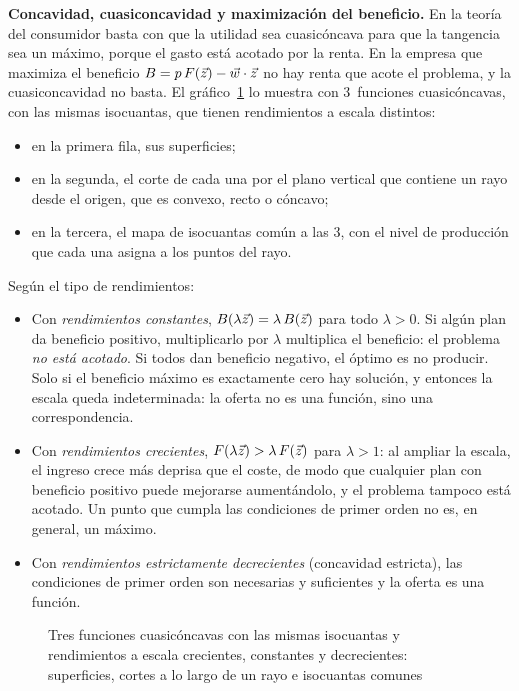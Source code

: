 \documentclass[11pt]{article}
\begin{document}
\begin{anotaciones}
\textbf{Concavidad, cuasiconcavidad y maximización del beneficio.}
En la teoría del consumidor basta con que la utilidad sea cuasicóncava para que la tangencia sea un máximo, porque el gasto está acotado por la renta. En la empresa que maximiza el beneficio $B=p\,F(\vec{z})-\vec{w}\cdot\vec{z}$ no hay renta que acote el problema, y la cuasiconcavidad no basta\nocite{Varian1992Microeconomic}\nocite{MasColellWhinstonGreen1995}. El gráfico~\ref{fig:rendimientos-escala-tipos-3d} lo muestra con 3~funciones cuasicóncavas, con las mismas isocuantas, que tienen rendimientos a escala distintos:
\begin{itemize}
\item en la primera fila, sus superficies;
\item en la segunda, el corte de cada una por el plano vertical que contiene un rayo desde el origen, que es convexo, recto o cóncavo;
\item en la tercera, el mapa de isocuantas común a las 3, con el nivel de producción que cada una asigna a los puntos del rayo.
\end{itemize}
Según el tipo de rendimientos:
\begin{itemize}
\item Con \emph{rendimientos constantes}, $B(\lambda\vec{z})=\lambda\,B(\vec{z})$ para todo $\lambda>0$. Si algún plan da beneficio positivo, multiplicarlo por $\lambda$ multiplica el beneficio: el problema \emph{no está acotado}. Si todos dan beneficio negativo, el óptimo es no producir. Solo si el beneficio máximo es exactamente cero hay solución, y entonces la escala queda indeterminada: la oferta no es una función, sino una correspondencia.
\item Con \emph{rendimientos crecientes}, $F(\lambda\vec{z})>\lambda\,F(\vec{z})$ para $\lambda>1$: al ampliar la escala, el ingreso crece más deprisa que el coste, de modo que cualquier plan con beneficio positivo puede mejorarse aumentándolo, y el problema tampoco está acotado. Un punto que cumpla las condiciones de primer orden no es, en general, un máximo.
\item Con \emph{rendimientos estrictamente decrecientes} (concavidad estricta), las condiciones de primer orden son necesarias y suficientes y la oferta es una función.
\end{itemize}

\begin{figure}[H]
\centering
\caption{Tres funciones cuasicóncavas con las mismas isocuantas y rendimientos a escala crecientes, constantes y decrecientes: superficies, cortes a lo largo de un rayo e isocuantas comunes}\label{fig:rendimientos-escala-tipos-3d}
\end{figure}


\end{anotaciones}
\end{document}
